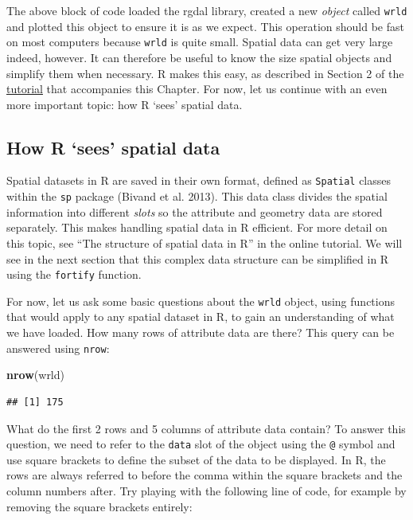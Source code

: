 \documentclass[]{article}
\newenvironment{Shaded}{}{}
\newcommand{\KeywordTok}[1]{\textcolor[rgb]{0.00,0.44,0.13}{\textbf{{#1}}}}
\newcommand{\NormalTok}[1]{{#1}}
\begin{document}
The above block of code loaded the rgdal library, created a new
\emph{object} called \texttt{wrld} and plotted this object to ensure it
is as we expect. This operation should be fast on most computers because
\texttt{wrld} is quite small. Spatial data can get very large indeed,
however. It can therefore be useful to know the size spatial objects and
simplify them when necessary. R makes this easy, as described in Section
2 of the
\href{https://github.com/geocomPP/sdvwR/blob/master/sdv-tutorial.pdf?raw=true}{tutorial}
that accompanies this Chapter. For now, let us continue with an even
more important topic: how R `sees' spatial data.

\subsection{How R `sees' spatial data}\label{how-r-sees-spatial-data}

Spatial datasets in R are saved in their own format, defined as
\texttt{Spatial} classes within the \texttt{sp} package (Bivand et al.
2013). This data class divides the spatial information into different
\emph{slots} so the attribute and geometry data are stored separately.
This makes handling spatial data in R efficient. For more detail on this
topic, see ``The structure of spatial data in R'' in the online
tutorial. We will see in the next section that this complex data
structure can be simplified in R using the \texttt{fortify} function.

For now, let us ask some basic questions about the \texttt{wrld} object,
using functions that would apply to any spatial dataset in R, to gain an
understanding of what we have loaded. How many rows of attribute data
are there? This query can be answered using \texttt{nrow}:

\begin{Shaded}
\begin{Highlighting}[]
\KeywordTok{nrow}\NormalTok{(wrld)}
\end{Highlighting}
\end{Shaded}

\begin{verbatim}
## [1] 175
\end{verbatim}

What do the first 2 rows and 5 columns of attribute data contain? To
answer this question, we need to refer to the \texttt{data} slot of the
object using the \texttt{@} symbol and use square brackets to define the
subset of the data to be displayed. In R, the rows are always referred
to before the comma within the square brackets and the column numbers
after. Try playing with the following line of code, for example by
removing the square brackets entirely:
\end{document}
